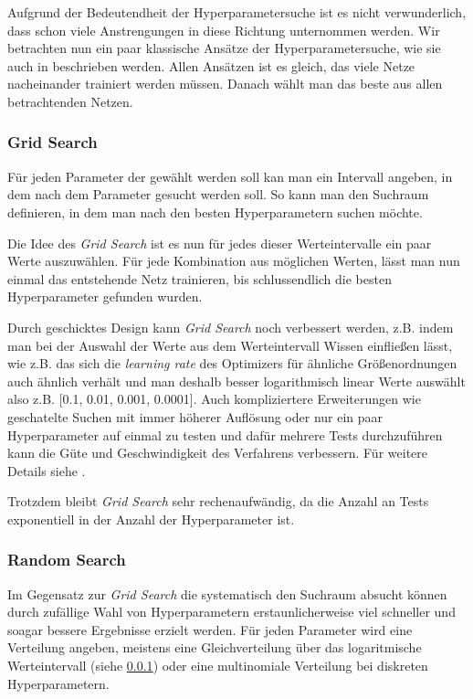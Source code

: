 \documentclass[]{scrartcl}
\begin{document}
		Aufgrund der Bedeutendheit der Hyperparametersuche ist es nicht verwunderlich, dass schon viele Anstrengungen in diese Richtung unternommen werden.
		Wir betrachten nun ein paar klassische Ansätze der Hyperparametersuche, wie sie auch in \cite{parameters} beschrieben werden.
		Allen Ansätzen ist es gleich, das viele Netze nacheinander trainiert werden müssen. Danach wählt man das beste aus allen betrachtenden Netzen.

		\subsubsection{Grid Search}\label{grid}

			Für jeden Parameter der gewählt werden soll kan man ein Intervall angeben, in dem nach dem Parameter gesucht werden soll.
			So kann man den Suchraum definieren, in dem man nach den besten Hyperparametern suchen möchte.
			
			Die Idee des \textit{Grid Search} ist es nun für jedes dieser Werteintervalle ein paar Werte auszuwählen.
			Für jede Kombination aus möglichen Werten, lässt man nun einmal das entstehende Netz trainieren, bis schlussendlich die besten Hyperparameter gefunden wurden.

			Durch geschicktes Design kann \textit{Grid Search} noch verbessert werden, z.B. indem man bei der Auswahl der Werte aus dem Werteintervall
			Wissen einfließen lässt, wie z.B. das sich die \textit{learning rate} des Optimizers für ähnliche Größenordnungen auch ähnlich verhält und 
			man deshalb besser logarithmisch linear Werte auswählt also z.B. [0.1, 0.01, 0.001, 0.0001].
			Auch kompliziertere Erweiterungen wie geschatelte Suchen mit immer höherer Auflösung oder
			nur ein paar Hyperparameter auf einmal zu testen und dafür mehrere Tests durchzuführen kann die Güte und Geschwindigkeit des Verfahrens verbessern.
			Für weitere Details siehe \cite{parameters}.

			Trotzdem bleibt \textit{Grid Search} sehr rechenaufwändig, da die Anzahl an Tests exponentiell in der Anzahl der Hyperparameter ist.


		\subsubsection{Random Search}

			Im Gegensatz zur \textit{Grid Search} die systematisch den Suchraum absucht können durch zufällige Wahl von Hyperparametern erstaunlicherweise
			viel schneller und soagar bessere Ergebnisse erzielt werden. \cite{randomsearch}
			Für jeden Parameter wird eine Verteilung angeben, meistens eine Gleichverteilung über das logaritmische Werteintervall (siehe \ref{grid})
			oder eine multinomiale Verteilung bei diskreten Hyperparametern.
\end{document}
